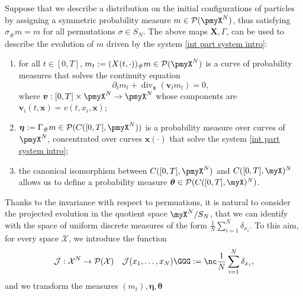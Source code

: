 \documentclass[10pt,leqno]{amsart}
\numberwithin{equation}{section}
\newcommand{\PP}{\mathcal{P}}
\begin{document}
Suppose that we describe a distribution
on the initial configurations of particles by assigning a symmetric
probability measure $m \in \PP(\pmyX^N)$,
thus satisfying $\sigma_\#m = m$ for all permutations $\sigma\in S_N$.
The above maps $\boldsymbol X,\Gamma$, 
can be used to describe the evolution of 
$m$ driven by the system \eqref{int part system intro}: 
\begin{enumerate}
    \item for all $t\in [0,T]$, $m_t := (X(t,\cdot))_\#m \in \PP(\pmyX^N)$ is a curve of probability measures that solves the continuity equation 
    \begin{equation}\label{eq: ce on R^d^N}
    \partial_t m_t + \operatorname{div}_{\boldsymbol{x}}(\boldsymbol{v}_tm_t) = 0,
    \end{equation}
    where $\boldsymbol v:[0,T]\times \pmyX^N\to \pmyX^N$ 
    whose components are $\boldsymbol v_i(t,\boldsymbol x)=v(t,x_i,\boldsymbol x)$;
    \item $\boldsymbol{\eta}:= \Gamma_\#m \in \PP(C([0,T],\pmyX^N))$ is a probability measure over curves of $\pmyX^N$, concentrated over curves $\boldsymbol{x}(\cdot)$ that solve the system \eqref{int part system intro}; 
    \item the canonical isomorphism 
    between $C([0,T],\pmyX^N)$ and $C([0,T],\myX)^N$  allows us to define a probability measure $\boldsymbol{\theta} \in \PP(C([0,T],\myX)^N)$.
\end{enumerate}
Thanks to the invariance with respect to permuations, it is natural
to consider the projected evolution
in the quotient space $\myX^N/S_N$,
that we can identify with the 
space of uniform discrete measures 
of the form $\frac{1}{N}\sum_{i=1}^N\delta_{x_i}.$
To this aim, for every space $\mathcal X$, we 
introduce the function
\begin{equation}\label{eq: 3}
    \mathcal{J}:
    \mathcal X^N \to \PP(\mathcal X)\quad 
    \mathcal{J}(x_1,\dots, x_N)
    \GGG :=
    \nc \frac{1}{N}\sum_{i=1}^N\delta_{x_i},
\end{equation}
and we 
transform the measures
$(m_t),\boldsymbol \eta,\boldsymbol \theta$ 
\end{document}
